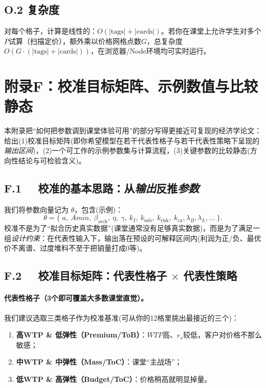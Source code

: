 \documentclass[UTF8,12pt]{ctexart}
\begin{document}
\subsection{O.2 复杂度}
对每个格子，计算是线性的：$O(|\text{tags}|+|\text{cards}|)$。若你在课堂上允许学生对多个$P$试算（扫描定价），额外乘以价格网格点数$G$，总复杂度$O(G\cdot (|\text{tags}|+|\text{cards}|))$，在浏览器/Node环境均可实时运行。



\clearpage
\appendix
\section*{附录F：校准目标矩阵、示例数值与比较静态}

本附录把“如何把参数调到课堂体验可用”的部分写得更接近可复现的经济学论文：给出(1)校准目标矩阵(即你希望模型在若干代表性格子与若干代表性策略下呈现的\emph{输出区间})，(2)一个可工作的示例参数集与计算流程，(3)关键参数的比较静态(方向性结论与可检验含义)。

\subsection*{F.1 \ \ 校准的基本思路：从\textit{输出}反推\textit{参数}}
我们将参数向量记为 $\theta$，包含(示例)：
\[
\theta=\{\;a,\ Amin,\ \beta_{\text{arch}},\ \eta,\ \gamma,\ k_I,\ k_{\text{sub}},\ k_{\text{risk}},\ k_{\text{cx}},\lambda_B,\lambda_L,\dots\;\}.
\]
校准不是为了“拟合历史真实数据”(课堂通常没有足够真实数据)，而是为了满足一组\emph{设计约束}：在代表性输入下，输出落在预设的可解释区间内(利润为正/负、最优价不离谱、过度堆料不至于把销量打成0等)。

\subsection*{F.2 \ \ 校准目标矩阵：代表性格子 $\times$ 代表性策略}
\paragraph{代表性格子（3个即可覆盖大多数课堂直觉）。}
我们建议选取三类格子作为校准基准(可从你的12格里挑出最接近的三个)：
\begin{enumerate}
  \item \textbf{高WTP \& 低弹性（Premium/ToB）}：$WTP$高、$e_s$较低，客户对价格不那么敏感；
  \item \textbf{中WTP \& 中弹性（Mass/ToC）}：课堂“主战场”；
  \item \textbf{低WTP \& 高弹性（Budget/ToC）}：价格稍高就明显掉量。
\end{enumerate}
\end{document}
